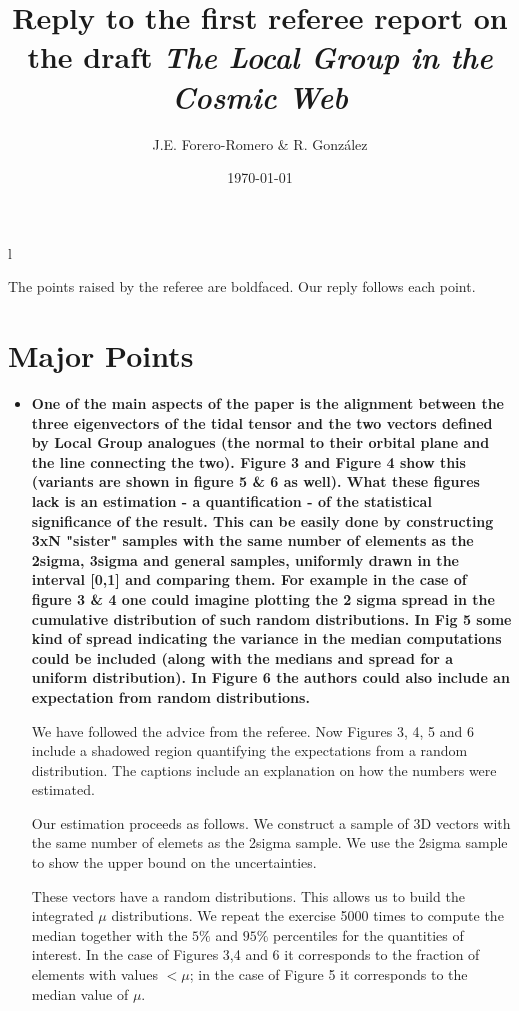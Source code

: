 \documentclass{article}
\title{Reply to the first referee report on the draft {\it The Local Group in the Cosmic Web}}
\author{J.E. Forero-Romero \& R. Gonz\'alez}
\date{\today}
\begin{document}
\maketitle
l

The points raised by the referee are boldfaced. Our reply follows each point.


\section{Major Points}
\begin{itemize}

\item
{\bf One of the main aspects of the paper is the alignment between the three eigenvectors of the tidal tensor and the two vectors defined by Local Group analogues (the normal to their orbital plane and the line connecting the two). Figure 3 and Figure 4 show this (variants are shown in figure 5 \& 6 as well). What these figures lack is an estimation - a quantification - of the statistical significance of the result. This can be easily done by constructing 3xN "sister" samples with the same number of elements as the 2sigma, 3sigma and general samples, uniformly drawn in the interval [0,1] and comparing them. For example in the case of figure 3 \& 4 one could imagine plotting the 2 sigma spread in the cumulative distribution of such random distributions. In Fig 5 some kind of spread indicating the variance in the median computations could be included (along with the medians and spread for a uniform distribution). In Figure 6 the authors could also include an expectation from random distributions.}

We have followed the advice from the referee. Now Figures 3, 4, 5 and 6 include a shadowed region quantifying the expectations from a random distribution. The captions include an explanation on how the numbers were estimated.

Our estimation proceeds as follows. We construct a sample of 3D vectors with the same number of elemets as the 2sigma sample. We use the 2sigma sample to show the upper bound on the uncertainties. 

These vectors have a random distributions. This allows us to build the integrated $\mu$ distributions. We repeat the exercise 5000 times to compute the median together with the $5\%$ and $95\%$ percentiles for the quantities of interest. In the case of Figures 3,4 and 6 it corresponds to the fraction of elements with values $<\mu$; in the case of Figure 5 it corresponds to the median value of $\mu$.







\end{itemize}
\end{document}
